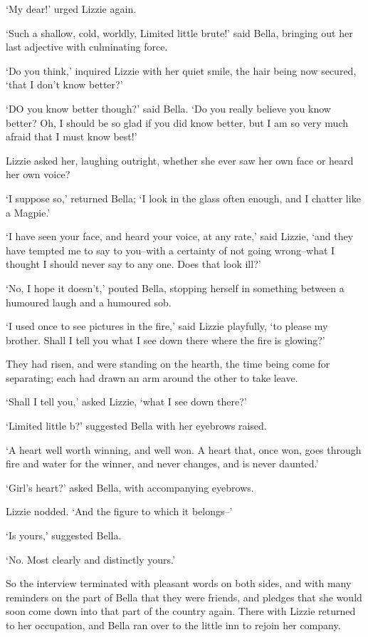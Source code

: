 ‘My dear!’ urged Lizzie again.

‘Such a shallow, cold, worldly, Limited little brute!’ said Bella,
bringing out her last adjective with culminating force.

‘Do you think,’ inquired Lizzie with her quiet smile, the hair being now
secured, ‘that I don’t know better?’

‘DO you know better though?’ said Bella. ‘Do you really believe you know
better? Oh, I should be so glad if you did know better, but I am so very
much afraid that I must know best!’

Lizzie asked her, laughing outright, whether she ever saw her own face
or heard her own voice?

‘I suppose so,’ returned Bella; ‘I look in the glass often enough, and I
chatter like a Magpie.’

‘I have seen your face, and heard your voice, at any rate,’ said Lizzie,
‘and they have tempted me to say to you--with a certainty of not going
wrong--what I thought I should never say to any one. Does that look
ill?’

‘No, I hope it doesn’t,’ pouted Bella, stopping herself in something
between a humoured laugh and a humoured sob.

‘I used once to see pictures in the fire,’ said Lizzie playfully, ‘to
please my brother. Shall I tell you what I see down there where the fire
is glowing?’

They had risen, and were standing on the hearth, the time being come for
separating; each had drawn an arm around the other to take leave.

‘Shall I tell you,’ asked Lizzie, ‘what I see down there?’

‘Limited little b?’ suggested Bella with her eyebrows raised.

‘A heart well worth winning, and well won. A heart that, once won, goes
through fire and water for the winner, and never changes, and is never
daunted.’

‘Girl’s heart?’ asked Bella, with accompanying eyebrows.

Lizzie nodded. ‘And the figure to which it belongs--’

‘Is yours,’ suggested Bella.

‘No. Most clearly and distinctly yours.’

So the interview terminated with pleasant words on both sides, and with
many reminders on the part of Bella that they were friends, and pledges
that she would soon come down into that part of the country again. There
with Lizzie returned to her occupation, and Bella ran over to the little
inn to rejoin her company.

